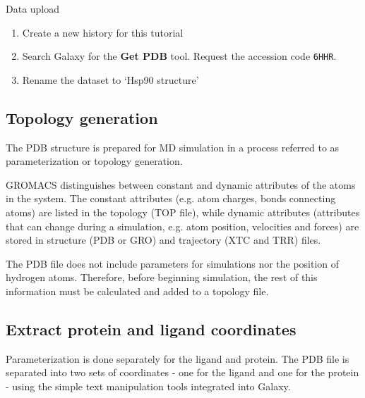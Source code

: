 \documentclass[twocolumn]{bmcart}%
\providecommand{\tightlist}{%
  \setlength{\itemsep}{0pt}\setlength{\parskip}{0pt}}
\begin{document}
\begin{handson_box_colour}{Data upload}

\begin{enumerate}
\def\labelenumi{\arabic{enumi}.}
\tightlist
\item
  Create a new history for this tutorial
\item
  Search Galaxy for the \textbf{Get PDB} tool. Request the accession code \texttt{6HHR}.
\item
  Rename the dataset to `Hsp90 structure'

\end{enumerate}
\end{handson_box_colour}

\subsection*{Topology generation}\label{topology-generation}

The PDB structure is prepared for MD simulation in a process referred to as parameterization or topology generation.

GROMACS distinguishes between constant and dynamic attributes of the
atoms in the system. The constant attributes (e.g. atom charges, bonds
connecting atoms) are listed in the topology (TOP file), while dynamic
attributes (attributes that can change during a simulation, e.g. atom
position, velocities and forces) are stored in structure (PDB or GRO)
and trajectory (XTC and TRR) files.

The PDB file does not include parameters for simulations nor the position of hydrogen atoms. Therefore, before beginning simulation, the rest of this information must be calculated and added to a topology file.


\subsection*{Extract protein and ligand
coordinates}\label{extract-protein-and-ligand-coordinates}

Parameterization is done separately for the ligand and protein.
The PDB file is separated into two sets of
coordinates - one for the ligand and one for the protein - using the simple text manipulation tools integrated into Galaxy.
\end{document}
